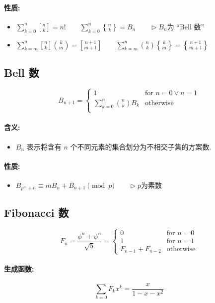 \paragraph{性质:}
\begin{itemize}
  \item $\displaystyle\sum_{k=0}^n\genfrac[]{0pt}0nk=n!\qquad\sum_{k=0}^n\genfrac\{\}{0pt}0nk=B_n\qquad\triangleright B_n\text{为 ``Bell 数''}$
  \item $\displaystyle\sum_{k=m}^n\genfrac[]{0pt}0nk\binom km=\genfrac[]{0pt}0{n+1}{m+1}\qquad\sum_{k=m}^n\binom nk\genfrac\{\}{0pt}0km=\genfrac\{\}{0pt}0{n+1}{m+1}$
\end{itemize}
\subsection{Bell 数}
\[
  B_{n+1}=\begin{cases}
    1&\text{for }n=0\lor n=1\\
    \displaystyle\sum_{k=0}^n\binom nkB_k&\text{otherwise}\\
  \end{cases}
\]
\paragraph{含义:}
\begin{itemize}
  \item $B_n$ 表示将含有 $n$ 个不同元素的集合划分为不相交子集的方案数.
\end{itemize}
\paragraph{性质:}
\begin{itemize}
  \item $B_{p^m+n}\equiv mB_n+B_{n+1}\pmod p\qquad\triangleright p\text{为素数}$
\end{itemize}

\subsection{Fibonacci 数}
\[
  F_n=\frac{\phi^n+\psi^n}{\sqrt5}=\begin{cases}
    0&\text{for }n=0\\
    1&\text{for }n=1\\
    F_{n-1}+F_{n-2}&\text{otherwise}
  \end{cases}
\]
\paragraph{生成函数:}
\[\sum_{k=0}F_kx^k=\frac x{1-x-x^2}\]
